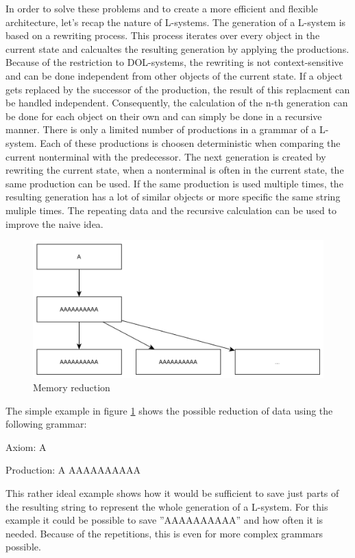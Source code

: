 \documentclass[english]{cpp-hmwk}
\begin{document}
\medskip
\noindent In order to solve these problems and to create a more efficient and flexible architecture, let's recap the nature of L-systems. The generation of a L-system is based on a rewriting process. This process iterates over every object in the current state and calcualtes the resulting generation by applying the productions. Because of the restriction to DOL-systems, the rewriting is not context-sensitive and can be done independent from other objects of the current state. If a object gets replaced by the successor of the production, the result of this replacment can be handled independent. Consequently, the calculation of the n-th generation can be done for each object on their own and can simply be done in a recursive manner.\newline
There is only a limited number of productions in a grammar of a L-system. Each of these productions is choosen deterministic when comparing the current nonterminal with the predecessor. The next generation is created by rewriting the current state, when a nonterminal is often in the current state, the same production can be used. If the same production is used multiple times, the resulting generation has a lot of similar objects or more specific the same string muliple times. The repeating data and the recursive calculation can be used to improve the naive idea.

\medskip
\begin{figure}[h!]
	\centering
	\includegraphics[width=0.8\columnwidth]{../graphs/simple_grammar_data_doubling.png}
	\caption{Memory reduction}
	\label{figure:lsystem_mem_reduction}
\end{figure}

\noindent The simple example in figure \ref{figure:lsystem_mem_reduction} shows the possible reduction of data using the following grammar:

Axiom: A

Production: A \rightarrow AAAAAAAAAA 

\medskip
\noindent This rather ideal example shows how it would be sufficient to save just parts of the resulting string to represent the whole generation of a L-system. For this example it could be possible to save ''AAAAAAAAAA'' and how often it is needed. Because of the repetitions, this is even for more complex grammars possible.
\end{document}
